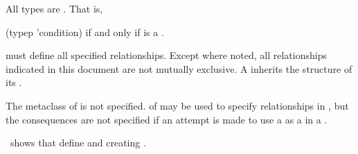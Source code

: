 All  types are .  That is,
 
\code
 (typep  'condition) \EV {}
\endcode
if and only if  is a .
 
 must define all specified  relationships.
Except where noted, all  relationships indicated in 
this document are not mutually exclusive.
A  inherits the structure of its .
 
The metaclass of  is not specified.
 of   may be used to specify
 relationships in , 
but the consequences are not specified if an attempt is made to use
a   as a  in a  .

%  

\Thenextfigure\ shows  that
define   and creating .


